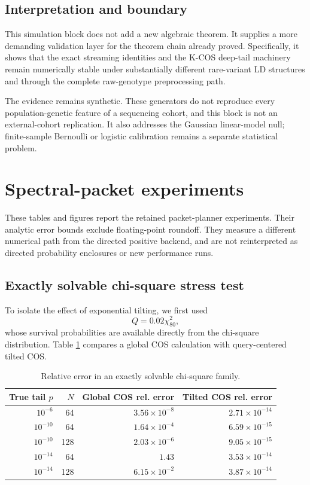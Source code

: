 \subsection{Interpretation and boundary}

This simulation block does not add a new algebraic theorem.  It supplies a
more demanding validation layer for the theorem chain already proved.
Specifically, it shows that the exact streaming identities and the K-COS
deep-tail machinery remain numerically stable under substantially different
rare-variant LD structures and through the complete raw-genotype preprocessing
path.

The evidence remains synthetic.  These generators do not reproduce every
population-genetic feature of a sequencing cohort, and this block is not an
external-cohort replication.  It also addresses the Gaussian linear-model null;
finite-sample Bernoulli or logistic calibration remains a separate statistical
problem.



\section{Spectral-packet experiments}
These tables and figures report the retained packet-planner experiments.
Their analytic error bounds exclude floating-point roundoff. They measure a
different numerical path from the directed positive backend, and are not
reinterpreted as directed probability enclosures or new performance runs.

\subsection{Exactly solvable chi-square stress test}

To isolate the effect of exponential tilting, we first used
\[
Q=0.02\chi^2_{80},
\]
whose survival probabilities are available directly from the chi-square distribution. Table \ref{tab:chi} compares a global COS calculation with query-centered tilted COS.

\begin{table}[htbp]
\centering
\caption{Relative error in an exactly solvable chi-square family.}
\label{tab:chi}
\begin{tabular}{rrrr}
\toprule
True tail $p$ & $N$ & Global COS rel. error & Tilted COS rel. error\\
\midrule
$10^{-6}$  & 64  & $3.56\times10^{-8}$ & $2.71\times10^{-14}$\\
$10^{-10}$ & 64  & $1.64\times10^{-4}$ & $6.59\times10^{-15}$\\
$10^{-10}$ & 128 & $2.03\times10^{-6}$ & $9.05\times10^{-15}$\\
$10^{-14}$ & 64  & $1.43$              & $3.53\times10^{-14}$\\
$10^{-14}$ & 128 & $6.15\times10^{-2}$ & $3.87\times10^{-14}$\\
\bottomrule
\end{tabular}
\end{table}

